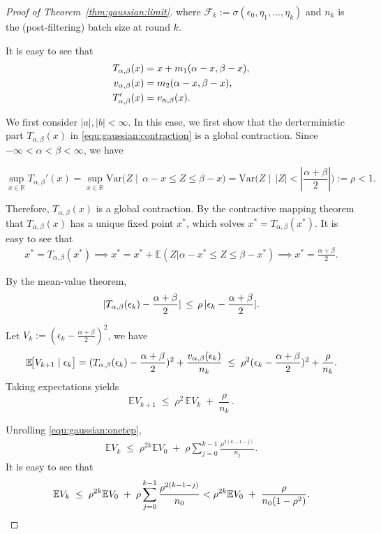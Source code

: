 \begin{proof}[Proof of Theorem~\ref{thm:gaussian:limit}]
where $\mathcal{F}_k := \sigma(\epsilon_0, \eta_1, \dots, \eta_k)$ and $n_k$ is the (post-filtering) batch size at round $k$.

It is easy to see that 
\begin{align}
    T_{\alpha,\beta}(x) &= x + m_1(\alpha - x,\beta - x),\notag\\
    v_{\alpha,\beta}(x) &= m_2(\alpha - x,\beta - x),\notag\\
    T_{\alpha,\beta}'(x) &= v_{\alpha,\beta}(x). \notag
\end{align}


We first consider $|a|,|b| < \infty$. In this case, we first show that the derterministic part $T_{\alpha,\beta}(x)$ in \eqref{equ:gaussian:contraction} is a global contraction.
Since $-\infty < \alpha < \beta <\infty$, we have

\[
\sup_{x \in \mathbb{R}} T_{\alpha,\beta}'(x) = \sup_{x \in \mathbb{R}} \mathrm{Var}\big(Z \mid\, \alpha - x \le Z \le \beta-x\big)  = \mathrm{Var}\big(Z \mid\, |Z| < |\frac{\alpha+\beta}{2}|\big):= \rho < 1.
\]

Therefore, $T_{\alpha,\beta}(x)$ is a global contraction. By the contractive mapping theorem that $T_{\alpha,\beta}(x)$ has a unique fixed point $x^*$, which solves $x^* = T_{\alpha,\beta}(x^*)$.
It is easy to see that
\begin{align}
x^* = T_{\alpha,\beta}(x^*) \implies x^* = x^* + \mathbb{E}(Z \big| \alpha - x^*\le Z \le \beta - x^*) \implies x^* = \frac{\alpha+\beta}{2}.
\end{align}


By the mean-value theorem,
\begin{equation}
|T_{\alpha,\beta}(\epsilon_k)-\frac{\alpha+\beta}{2}|\,\le\,\rho\,|\epsilon_k-\frac{\alpha+\beta}{2}|.\notag
\end{equation}

Let $V_k:=(\epsilon_k-\frac{\alpha+\beta}{2})^2$, we have
\begin{align}
\mathbb{E}\!\big[V_{k+1}\mid \epsilon_k\big]
=(T_{\alpha,\beta}(\epsilon_k)-\frac{\alpha+\beta}{2})^2+\frac{v_{\alpha,\beta}(\epsilon_k)}{n_k}
\;\le\;\rho^2 (\epsilon_k-\frac{\alpha+\beta}{2})^2+\frac{\rho}{n_k}.\notag
\end{align}
Taking expectations yields
\begin{equation}\label{equ:gaussian:onetep}
\mathbb{E} V_{k+1}\;\le\;\rho^2\,\mathbb{E} V_k\;+\;\frac{\rho}{n_k}\,.
\end{equation}

Unrolling \eqref{equ:gaussian:onetep},
\begin{align}\label{equ:gaussian:bound}
\mathbb{E} V_k
\;\le\;\rho^{2k}\mathbb{E}V_0\;+\;\rho\sum_{j=0}^{k-1}\frac{\rho^{2(k-1-j)}}{n_j}.
\end{align}
It is easy to see that 
\begin{align}
\mathbb{E} V_k
\;\le\; \rho^{2k}\mathbb{E}V_0\;+\;\rho\sum_{j=0}^{k-1}\frac{\rho^{2(k-1-j)}}{n_0} < \rho^{2k}\mathbb{E}V_0\;+\;\frac{\rho}{n_0(1-\rho^2)}.\notag
\end{align}


\end{proof}
